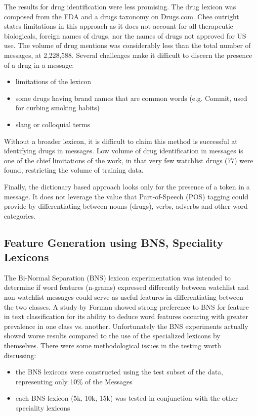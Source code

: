 \documentclass[twoside,11pt]{article}
\begin{document}
The results for drug identification were less promising.  The drug lexicon was composed from the FDA and a drugs taxonomy on Drugs.com. Chee outright states limitations in this approach as it does not account for all therapeutic biologicals, foreign names of drugs, nor the names of drugs not approved for US use. The volume of drug mentions was considerably less than the total number of messages, at 2,228,588. Several challenges make it difficult to discern the presence of a drug in a message:
\begin{itemize}
  \item limitations of the lexicon
  \item some drugs having brand names that are common words (e.g. Commit, used for curbing smoking habits)
  \item slang or colloquial terms
\end{itemize}

Without a broader lexicon, it is difficult to claim this method is successful at identifying drugs in messages. Low volume of drug identification in messages is one of the chief limitations of the work, in that very few watchlist drugs (77) were found, restricting the volume of training data.

Finally, the dictionary based approach looks only for the presence of a token in a message. It does not leverage the value that Part-of-Speech (POS) tagging could provide by differentiating between nouns (drugs), verbs, adverbs and other word categories.


\subsection{Feature Generation using BNS, Speciality Lexicons}
The Bi-Normal Separation (BNS) lexicon experimentation was intended to determine if word features (n-grams) expressed differently between watchlist and non-watchlist messages could serve as useful features in differentiating between the two classes. A study by Forman \citep{Forman} showed strong preference to BNS for feature in text classification for its ability to deduce word features occuring with greater prevalence in one class vs. another. Unfortunately the BNS experiments actually showed worse results compared to the use of the specialized lexicons by themselves. There were some methodological issues in the testing worth discussing:
\begin{itemize}
  \item the BNS lexicons were constructed using the test subset of the data, representing only 10\% of the Messages
  \item each BNS lexicon (5k, 10k, 15k) was tested in conjunction with the other speciality lexicons
\end{itemize}
\end{document}

